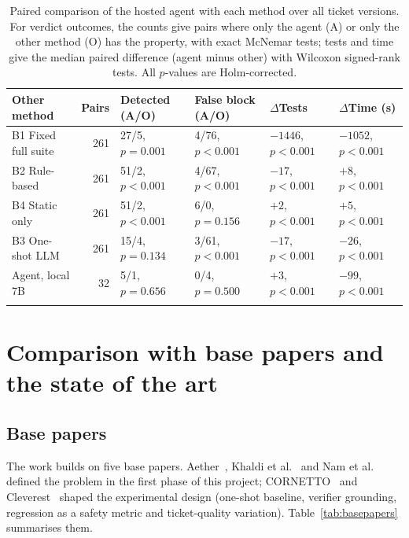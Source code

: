 \documentclass[pdflatex,iicol,sn-mathphys-num]{sn-jnl}%
\theoremstyle{thmstyletwo}%
\begin{document}
\begin{table}[t]
\caption{Paired comparison of the hosted agent with each method over all ticket versions. For verdict outcomes, the counts give pairs where only the agent (A) or only the other method (O) has the property, with exact McNemar tests; tests and time give the median paired difference (agent minus other) with Wilcoxon signed-rank tests. All $p$-values are Holm-corrected.}\label{tab:stats}
\centering\footnotesize
\begin{tabular}{@{}lrllll@{}}
\toprule
Other method & Pairs & Detected (A/O) & False block (A/O) & $\Delta$Tests & $\Delta$Time (s)\\
\midrule
B1 Fixed full suite & 261 & 27/5, $p=0.001$ & 4/76, $p<0.001$ & $-1446$, $p<0.001$ & $-1052$, $p<0.001$\\
B2 Rule-based & 261 & 51/2, $p<0.001$ & 4/67, $p<0.001$ & $-17$, $p<0.001$ & $+8$, $p<0.001$\\
B4 Static only & 261 & 51/2, $p<0.001$ & 6/0, $p=0.156$ & $+2$, $p<0.001$ & $+5$, $p<0.001$\\
B3 One-shot LLM & 261 & 15/4, $p=0.134$ & 3/61, $p<0.001$ & $-17$, $p<0.001$ & $-26$, $p<0.001$\\
Agent, local 7B & 32 & 5/1, $p=0.656$ & 0/4, $p=0.500$ & $+3$, $p<0.001$ & $-99$, $p<0.001$\\
\botrule
\end{tabular}
\end{table}

\section{Comparison with base papers and the state of the art}\label{sec:comparison}

\subsection{Base papers}\label{sec:base}

The work builds on five base papers. Aether~\cite{auge2026aether}, Khaldi et al.~\cite{khaldi2026agentic} and Nam et al.~\cite{nam2026vnf} defined the problem in the first phase of this project; CORNETTO~\cite{asadli2026cornetto} and Cleverest~\cite{liu2026cleverest} shaped the experimental design (one-shot baseline, verifier grounding, regression as a safety metric and ticket-quality variation). Table~\ref{tab:basepapers} summarises them.
\end{document}
